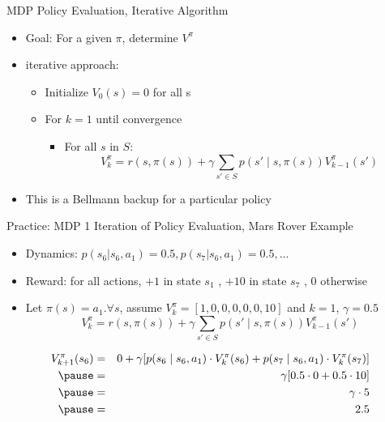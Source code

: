\documentclass[aspectratio=169]{../latex_main/tntbeamer}  %
\begin{document}
\begin{frame}[c]{MDP Policy Evaluation, Iterative Algorithm}

\begin{itemize}
	\item Goal: For a given $\pi$, determine $V^\pi$
	\item iterative approach:
	\begin{itemize}
		\item Initialize $V_0(s) = 0 $ for all s
		\item For $k=1$ until convergence
		\begin{itemize}
			\item For all $s$ in $S$:
			$$V^\pi_k  = r(s, \pi(s)) + \gamma \sum_{s'\in S} p(s'\mid s, \pi(s)) V_{k-1}^\pi (s')$$
		\end{itemize}
	\end{itemize}
	\item This is a Bellmann backup for a particular policy
\end{itemize}

\end{frame}
\begin{frame}[c]{Practice: MDP 1 Iteration of Policy Evaluation, Mars Rover Example}

\begin{itemize}
	\item Dynamics: $p(s_6 |s_6 , a_1 ) = 0.5, p(s_7 |s_6 , a_1 ) = 0.5, \ldots$
	\item Reward: for all actions, $+1$ in state $s_1$ , $+10$ in state $s_7$ , $0$ otherwise
	\item Let $\pi(s) = a_1.\forall s$, assume $V^\pi_k =[1,0,0,0,0,0,10]$ and $k = 1$, $\gamma = 0.5$
			$$V^\pi_k  = r(s, \pi(s)) + \gamma \sum_{s'\in S} p(s'\mid s, \pi(s)) V_{k-1}^\pi (s')$$
\end{itemize}

\pause

\begin{eqnarray}
V^\pi_{k+1} (s_6) &=& 0  + \gamma [ p(s_6 \mid s_6, a_1) \cdot V^\pi_k(s_6) + p(s_7 \mid s_6 , a_1) \cdot V^\pi_k(s_7) ] \nonumber\\
\pause
&=& \gamma [0.5 \cdot 0 + 0.5 \cdot 10] \nonumber\\
\pause
&=& \gamma \cdot 5 \nonumber\\
\pause
&=& 2.5 \nonumber\\
\end{eqnarray}

\end{frame}
\end{document}
